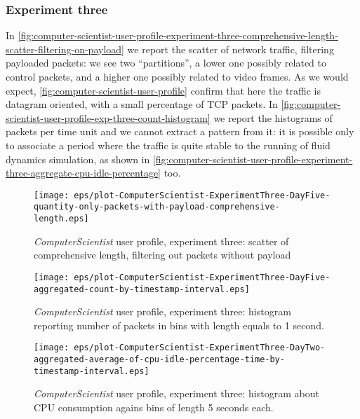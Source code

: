 \documentclass[10pt,a4paper]{article}
\begin{document}
    \subsubsection*{Experiment three}

    In
    \autoref{fig:computer-scientist-user-profile-experiment-three-comprehensive-length-scatter-filtering-on-payload}
    we report the scatter of network traffic, filtering payloaded
    packets: we see two ``partitions'', a lower one possibly related
    to control packets, and a higher one possibly related to video
    frames. As we would expect,
    \autoref{fig:computer-scientist-user-profile} confirm that here
    the traffic is datagram oriented, with a small percentage of TCP
    packets. In
    \autoref{fig:computer-scientist-user-profile-exp-three-count-histogram}
    we report the histograms of packets per time unit and we cannot
    extract a pattern from it: it is possible only to associate a
    period where the traffic is quite stable to the running of fluid
    dynamics simulation, as shown in
    \autoref{fig:computer-scientist-user-profile-experiment-three-aggregate-cpu-idle-percentage}
    too.

    \begin{figure}
      \centering
      \texttt{[image: eps/plot-ComputerScientist-ExperimentThree-DayFive-quantity-only-packets-with-payload-comprehensive-length.eps]}
      \caption{\emph{ComputerScientist} user profile, experiment
        three: scatter of comprehensive length, filtering out packets
        without payload}
      \label{fig:computer-scientist-user-profile-experiment-three-comprehensive-length-scatter-filtering-on-payload}
    \end{figure}

    \begin{figure}
      \centering
      \texttt{[image: eps/plot-ComputerScientist-ExperimentThree-DayFive-aggregated-count-by-timestamp-interval.eps]}
      \caption{\emph{ComputerScientist} user profile, experiment three: histogram
        reporting number of packets in bins with length equals to 1
        second.}
      \label{fig:computer-scientist-user-profile-exp-three-count-histogram}
    \end{figure}

    \begin{figure}
      \centering
      \texttt{[image: eps/plot-ComputerScientist-ExperimentThree-DayTwo-aggregated-average-of-cpu-idle-percentage-time-by-timestamp-interval.eps]}
      \caption{\emph{ComputerScientist} user profile, experiment
        three: histogram about CPU consumption agains bins of length 5
        seconds each.}
      \label{fig:computer-scientist-user-profile-experiment-three-aggregate-cpu-idle-percentage}
    \end{figure}
\end{document}
